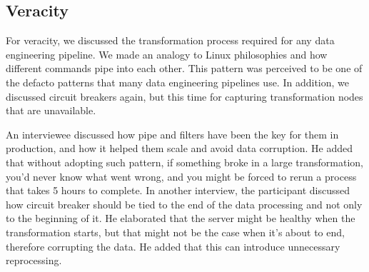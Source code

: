\documentclass[a4paper,11pt,article,oneside]{memoir}
\begin{document}
\subsection{Veracity}

For veracity, we discussed the transformation process required for any data engineering pipeline. We made an analogy to Linux philosophies and how different commands pipe into each other. This pattern was perceived to be one of the defacto patterns that many data engineering pipelines use. In addition, we discussed circuit breakers again, but this time for capturing transformation nodes that are unavailable.


An interviewee discussed how pipe and filters have been the key for them in production, and how it helped them scale and avoid data corruption. He added that without adopting such pattern, if something broke in a large transformation, you'd never know what went wrong, and you might be forced to rerun a process that takes 5 hours to complete. In another interview, the participant discussed how circuit breaker should be tied to the end of the data processing and not only to the beginning of it. He elaborated that the server might be healthy when the transformation starts, but that might not be the case when it's about to end, therefore corrupting the data. He added that this can introduce unnecessary reprocessing. 





\end{document}
